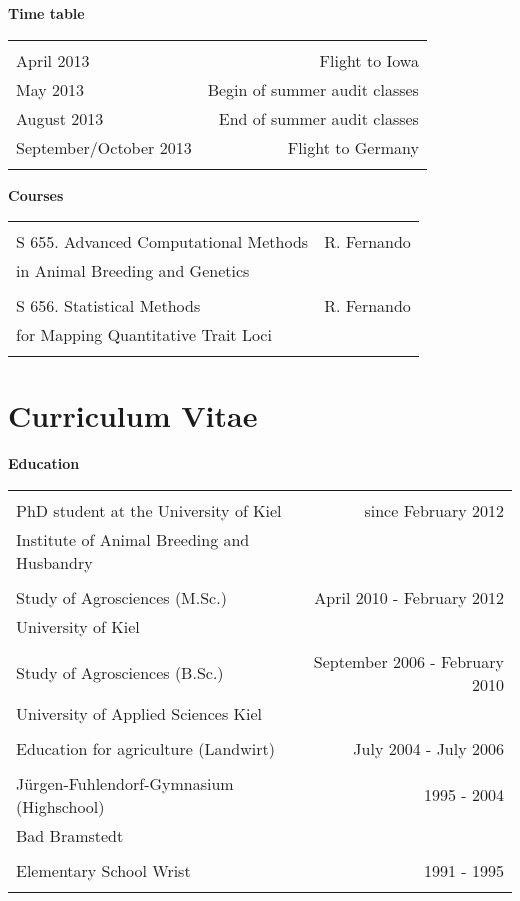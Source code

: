 \documentclass[a4paper,DIVcalc,12pt,liststotoc,headsepline,plainheadsepline]{scrartcl}
\begin{document}
\textbf{Time table}

\begin{tabularx}{\textwidth}{lR}
 &  \\ 
April 2013 & Flight to Iowa \\ 
May 2013 & Begin of summer audit classes \\ 
August 2013 & End of summer audit classes \\ 
September/October 2013 & Flight to Germany \\ 
 &  \\ 
\end{tabularx}

\textbf{Courses}

\begin{tabularx}{\textwidth}{lR}
 &  \\ 
S 655. Advanced Computational Methods  & R. Fernando \\ 
in Animal Breeding and Genetics & \\ 
 &  \\ 
S 656. Statistical Methods & R. Fernando \\ 
for Mapping Quantitative Trait Loci & \\ 
 &  \\ 
\end{tabularx}




\clearpage
\section{Curriculum Vitae}
  
\textbf{\large{Education}}

\begin{tabularx}{\textwidth}{lR}
 &  \\ 
PhD student at the  University of Kiel & since February 2012 \\ 
Institute of Animal Breeding and Husbandry &  \\ 

 &  \\ 
Study of Agrosciences (M.Sc.) & April 2010 - February 2012 \\ 
University of Kiel &  \\
 &  \\ 

Study of Agrosciences (B.Sc.)  & September 2006 - February 2010 \\ 
University of Applied Sciences Kiel &  \\ 
 &  \\ 
Education for agriculture (Landwirt) & July 2004 - July 2006  \\ 
 &  \\ 
Jürgen-Fuhlendorf-Gymnasium (Highschool) & 1995 - 2004 \\ 
Bad Bramstedt &  \\ 
 &  \\ 
Elementary School Wrist & 1991 - 1995 \\ 
 &  \\ 
\end{tabularx} 
\end{document}
